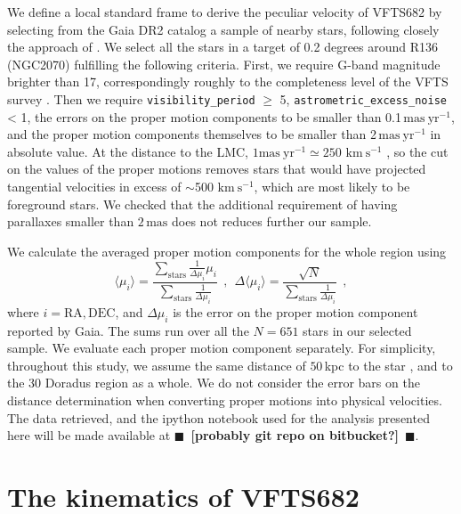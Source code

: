 \documentclass[apjl,twocolumn]{emulateapj}
\newcommand{\todo}[1]{{\large $\blacksquare$~\textbf{\color{red}[#1]}}~$\blacksquare$}
\newcommand{\SdM}[1]{{{\color{Sepia}{#1}}}}
\newcommand{\kms}{{\,\mathrm{km\ s^{-1}}}}
\begin{document}
We define a local standard frame \SdM{of reference} to derive the peculiar velocity
of VFTS682 by selecting from the Gaia DR2 catalog a sample of nearby
stars, following closely the approach of \cite{lennon:18}.
We select all the stars in a target of 0.2 degrees around R136
(NGC2070) fulfilling the following criteria. First, we require G-band
magnitude brighter than 17, correspondingly roughly to the
completeness level of the VFTS survey \citep[here we implicitly assume
G$\sim$V,][]{evans:11}. Then we require \texttt{visibility\_period} $\geq$ 5,
\texttt{astrometric\_excess\_noise} < 1, the errors on the proper
motion components to be smaller than 0.1\,$\mathrm{mas\ yr^{-1}}$,
and the proper motion components themselves to be smaller than
2\,$\mathrm{mas\ yr^{-1}}$ in absolute value. At the distance to the
LMC, $1\mathrm{mas\ yr^{-1}}\simeq250\,\kms$ \citep[e.g.,][]{lennon:18}, so the cut on the values
of the proper motions removes stars that would have projected
tangential velocities in excess of $\sim$500\,$\kms$, which are most
likely to be foreground stars. We checked that the additional
requirement of having parallaxes smaller than $2\,\mathrm{mas}$ does
not reduces further our sample. 

We calculate the averaged proper motion components for the whole
region using 
\begin{equation}
  \label{eq:mean}
  \langle \mu_i\rangle = \frac{\sum_\mathrm{stars}\frac{1}{\Delta
      \mu_i}\mu_i}{\sum_\mathrm{stars} \frac{1}{\Delta \mu_i}} \ \ , \
  \ \Delta \langle \mu_i\rangle = \frac{\sqrt{N}}{\sum_\mathrm{stars}
    \frac{1}{\Delta \mu_i}} \ \ ,
\end{equation}
where $i = \mathrm{RA}, \mathrm{DEC}$, and $\Delta \mu_i$ is the error
on the proper motion component reported by Gaia. The sums run over
all the $N=651$ stars in our selected sample. We evaluate each proper motion
component separately. For simplicity, throughout this study, we assume the same
distance of $50$\,kpc to the star \citep[][]{lebouteiller:08}, and to
the 30 Doradus region as a whole. We do not consider the error bars on
the distance determination when converting proper motions into
physical velocities. The data retrieved, and the ipython notebook used for the analysis
presented here will be made available at \todo{probably git repo on bitbucket?}. 

\section{The kinematics of VFTS682}
\label{sec:results}
\end{document}
